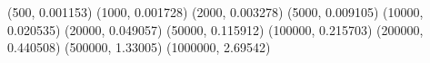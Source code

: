 (500, 0.001153) (1000, 0.001728) (2000, 0.003278) (5000, 0.009105) (10000, 0.020535) (20000, 0.049057) (50000, 0.115912) (100000, 0.215703) (200000, 0.440508) (500000, 1.33005) (1000000, 2.69542) 